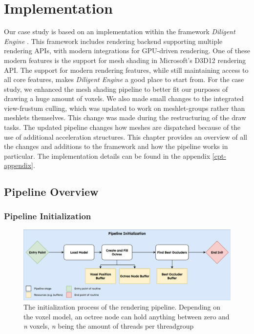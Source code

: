 \chapter{Implementation} \label{cpt-implementation}

Our case study is based on an implementation within the framework \emph{Diligent Engine} 
\cite{DiligentGraphicsGitHub, DiligentGraphics}. This framework includes rendering backend supporting 
multiple rendering \ac{API}s, with modern integrations for \ac{GPU}-driven rendering. One of these modern 
features is the support for mesh shading in Microsoft's D3D12 rendering \ac{API}. The support for modern 
rendering features, while still maintaining access to all core features, makes \emph{Diligent Engine} a good 
place to start from. For the case study, we enhanced the mesh shading pipeline to better fit our purposes of 
drawing a huge amount of voxels. We also made small changes to the integrated view-frustum culling, which was 
updated to work on meshlet-groups rather than meshlets themselves. This change was made during the restructuring 
of the draw tasks. The updated pipeline changes how meshes are dispatched because of the use of additional 
acceleration structures. This chapter provides an overview of all the changes and additions to the framework and 
how the pipeline works in particular. The implementation details can be found in the appendix \ref{cpt-appendix}.

\section{Pipeline Overview} \label{sec-piepline-initialization}


\subsection*{Pipeline Initialization} \label{subsec-piepline-initialization}

\begin{figure}[h]
    \centering
    \includegraphics[width=\linewidth]{images/graphics/pipeline-initialization.jpg}
    \caption{The initialization process of the rendering pipeline. Depending on the voxel model, an octree node 
    can hold anything between zero and \emph{n} voxels, \emph{n} being the amount of threads per threadgroup}
    \label{fig:pipeline-initialization}
\end{figure}

